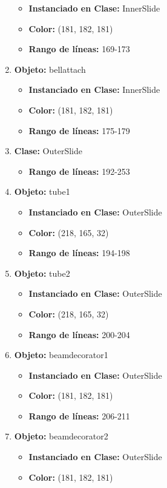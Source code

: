 \documentclass[10pt, a4paper]{article}
\begin{document}
\begin{enumerate}
\begin{itemize}
		\item \textbf{Instanciado en Clase:} InnerSlide
		\item \textbf{Color:} (181, 182, 181)
		\item \textbf{Rango de líneas:} 169-173
	\end{itemize}
	\item \textbf{Objeto:} bellattach
	\begin{itemize}
		\item \textbf{Instanciado en Clase:} InnerSlide
		\item \textbf{Color:} (181, 182, 181)
		\item \textbf{Rango de líneas:} 175-179
	\end{itemize}
	\item \textbf{Clase:} OuterSlide 
	\begin{itemize}
		\item \textbf{Rango de líneas:} 192-253
	\end{itemize}
	\item \textbf{Objeto:} tube1
	\begin{itemize}
		\item \textbf{Instanciado en Clase:} OuterSlide
		\item \textbf{Color:} (218, 165, 32)
		\item \textbf{Rango de líneas:} 194-198
	\end{itemize}
	\item \textbf{Objeto:} tube2
	\begin{itemize}
		\item \textbf{Instanciado en Clase:} OuterSlide
		\item \textbf{Color:} (218, 165, 32)
		\item \textbf{Rango de líneas:} 200-204
	\end{itemize}
	\item \textbf{Objeto:} beamdecorator1
	\begin{itemize}
		\item \textbf{Instanciado en Clase:} OuterSlide
		\item \textbf{Color:} (181, 182, 181)
		\item \textbf{Rango de líneas:} 206-211
	\end{itemize}
	\item \textbf{Objeto:} beamdecorator2
	\begin{itemize}
		\item \textbf{Instanciado en Clase:} OuterSlide
		\item \textbf{Color:} (181, 182, 181)

\end{itemize}
\end{enumerate}
\end{document}
